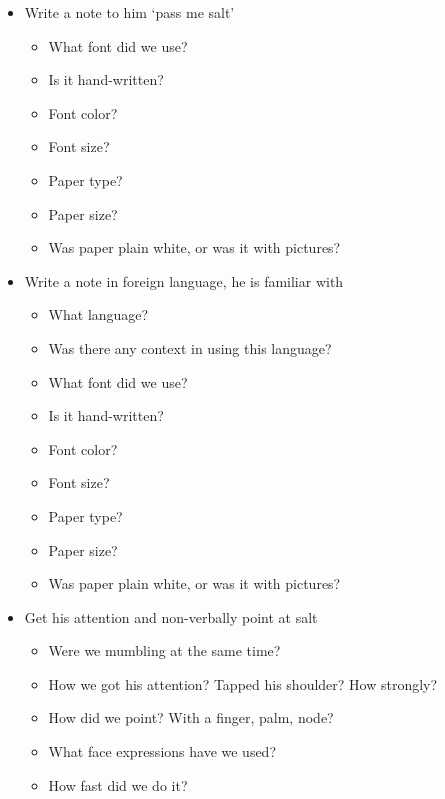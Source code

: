 \documentclass{report}
\begin{document}
\begin{itemize}
                \item Write a note to him `pass me salt'
                \begin{itemize}
                    \item What font did we use?
                    \item Is it hand-written?
                    \item Font color?
                    \item Font size?
                    \item Paper type?
                    \item Paper size?
                    \item Was paper plain white, or was it with pictures?
                \end{itemize}

                \item Write a note in foreign language, he is familiar with
                \begin{itemize}
                    \item What language?
                    \item Was there any context in using this language?
                    \item What font did we use?
                    \item Is it hand-written?
                    \item Font color?
                    \item Font size?
                    \item Paper type?
                    \item Paper size?
                    \item Was paper plain white, or was it with pictures?
                \end{itemize}

                \item Get his attention and non-verbally point at salt
                \begin{itemize}
                    \item Were we mumbling at the same time?
                    \item How we got his attention? Tapped his shoulder? How strongly?
                    \item How did we point? With a finger, palm, node?
                    \item What face expressions have we used?
                    \item How fast did we do it? 
                \end{itemize}


\end{itemize}
\end{document}
